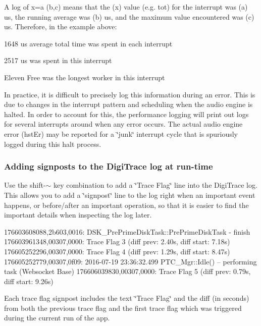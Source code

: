 A log of \textquotesingle{}x=a (b,c)\textquotesingle{} means that the (x) value (e.\+g. {\ttfamily tot}) for the interrupt was (a) us, the running average was (b) us, and the maximum value encountered was (c) us. Therefore, in the example above\+:

 
\begin{DoxyItemize}
\item 1648 us average total time was spent in each interrupt  
\item 2517 us was spent in this interrupt  
\item Eleven Free was the longest worker in this interrupt  
\end{DoxyItemize}

 In practice, it is difficult to precisely log this information during an error. This is due to changes in the interrupt pattern and scheduling when the audio engine is halted. In order to account for this, the performance logging will print out logs for several interrupts around when any error occurs. The actual audio engine error ({\ttfamily hst\+Er}) may be reported for a \char`\"{}junk\char`\"{} interrupt cycle that is spuriously logged during this halt process.

\hypertarget{a00834_digitrace__signposting}{}\subsubsection{Adding signposts to the Digi\+Trace log at run-\/time}\label{a00834_digitrace__signposting}
 Use the shift-\/\textquotesingle{}$\sim$\textquotesingle{} key combination to add a \char`\"{}\+Trace Flag\char`\"{} line into the Digi\+Trace log. This allows you to add a \char`\"{}signpost\char`\"{} line to the log right when an important event happens, or before/after an important operation, so that it is easier to find the important details when inspecting the log later.

\begin{DoxyVerb}176603608088,2b603,0016: DSK_PrePrimeDiskTask::PrePrimeDiskTask - finish
176603961348,00307,0000: Trace Flag 3 (diff prev: 2.40s, diff start: 7.18s)
176605252296,00307,0000: Trace Flag 4 (diff prev: 1.29s, diff start: 8.47s)
176605252779,00307,0f09: 2016-07-19 23:36:32.499 PTC_Mgr::Idle() -- performing task (Websocket Base)
176606039830,00307,0000: Trace Flag 5 (diff prev: 0.79s, diff start: 9.26s)\end{DoxyVerb}


 Each trace flag signpost includes the text \char`\"{}\+Trace Flag\char`\"{} and the diff (in seconds) from both the previous trace flag and the first trace flag which was triggered during the current run of the app.

